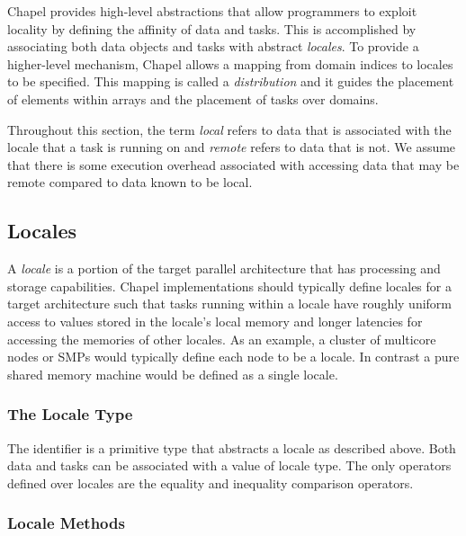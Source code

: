 \label{Locality_and_Distribution}

Chapel provides high-level abstractions that allow programmers to
exploit locality by defining the affinity of data and tasks.  This is
accomplished by associating both data objects and tasks with abstract
{\em locales}. To provide a higher-level mechanism, Chapel allows a
mapping from domain indices to locales to be specified. This mapping
is called a {\em distribution} and it guides the placement of elements
within arrays and the placement of tasks over domains.

Throughout this section, the term {\em local} refers to data that is
associated with the locale that a task is running on and {\em remote}
refers to data that is not. We assume that there is some execution
overhead associated with accessing data that may be remote compared to
data known to be local.

\subsection{Locales}
\label{Locales}

A \emph{locale} is a portion of the target parallel architecture that
has processing and storage capabilities.  Chapel implementations
should typically define locales for a target architecture such that
tasks running within a locale have roughly uniform access to values
stored in the locale's local memory and longer latencies for accessing
the memories of other locales.  As an example, a cluster of multicore
nodes or SMPs would typically define each node to be a locale.  In
contrast a pure shared memory machine would be defined as a single
locale.

\subsubsection{The Locale Type}
\label{The_Locale_Type}

The identifier  is a primitive type that abstracts a
locale as described above.  Both data and tasks can be associated with
a value of locale type. The only operators defined over locales are
the equality and inequality comparison operators.

\subsubsection{Locale Methods}
\label{Locale_Methods}

